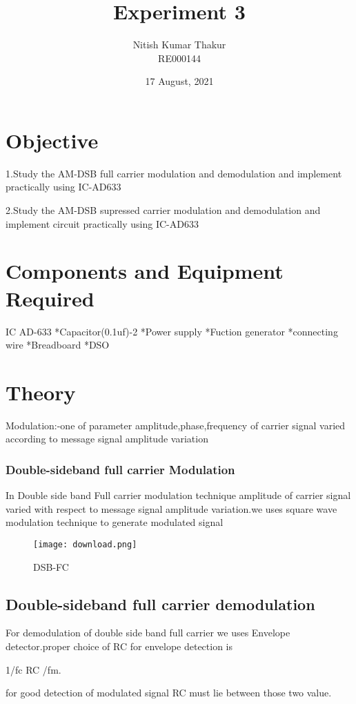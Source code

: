 \documentclass{article}
\title{Experiment 3}
\author{Nitish Kumar Thakur \\ RE000144 }
\date{17 August, 2021}
\begin{document}
\maketitle

\section{Objective}
1.Study the AM-DSB full carrier modulation and demodulation and implement  practically using IC-AD633\par2.Study the AM-DSB supressed carrier modulation and demodulation and implement circuit practically using IC-AD633

\section{Components and Equipment Required}                    
 IC AD-633 *Capacitor(0.1uf)-2 *Power supply *Fuction generator *connecting wire *Breadboard *DSO
 
 
 
\section{Theory}
Modulation:-one of parameter amplitude,phase,frequency of carrier signal varied according to message signal amplitude variation


\subsubsection{Double-sideband full carrier Modulation}
In Double side band Full carrier modulation technique amplitude of carrier signal varied with respect to message signal amplitude variation.we uses square wave modulation technique to generate modulated signal
\begin{figure*}[ht]
	\centering
	\texttt{[image: download.png]}
	\caption{DSB-FC}
	\label{DSF}
\end{figure*}

\subsection{Double-sideband full carrier demodulation}
For demodulation of double side band full carrier we uses Envelope detector.proper choice of RC for envelope detection is  \par
1/fc \ll RC /fm.\par
for good detection of modulated signal RC must lie between those two value.
\end{document}
